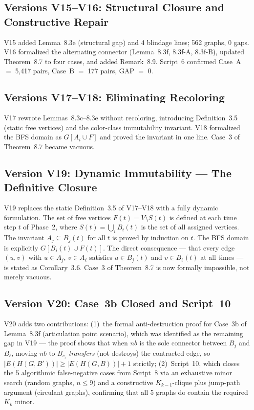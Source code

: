 \documentclass[12pt,a4paper]{article}
\theoremstyle{definition}
\begin{document}
\subsection{Versions V15--V16: Structural Closure and Constructive Repair}

V15 added Lemma~8.3e (structural gap) and 4 blindage lines; 562 graphs,
0 gaps. V16 formalized the alternating connector (Lemma~8.3f, 8.3f-A,
8.3f-B), updated Theorem~8.7 to four cases, and added Remark~8.9.
Script~6 confirmed Case~A $=$ 5,417 pairs, Case~B $=$ 177 pairs,
GAP $=$ 0.

\subsection{Versions V17--V18: Eliminating Recoloring}

V17 rewrote Lemmas~8.3c--8.3e without recoloring, introducing
Definition~3.5 (static free vertices) and the color-class immutability
invariant. V18 formalized the BFS domain as $G[A_i \cup F]$ and proved
the invariant in one line. Case~3 of Theorem~8.7 became vacuous.

\subsection{Version V19: Dynamic Immutability --- The Definitive Closure}

V19 replaces the static Definition~3.5 of V17--V18 with a fully dynamic
formulation. The set of free vertices $F(t) = V \setminus S(t)$ is
defined at each time step $t$ of Phase~2, where $S(t) = \bigcup_i B_i(t)$
is the set of all assigned vertices. The invariant $A_j \subseteq B_j(t)$
for all $t$ is proved by induction on $t$. The BFS domain is explicitly
$G[B_i(t) \cup F(t)]$. The direct consequence --- that every edge
$(u,v)$ with $u \in A_j$, $v \in A_\ell$ satisfies $u \in B_j(t)$ and
$v \in B_\ell(t)$ at all times --- is stated as Corollary~3.6.
Case~3 of Theorem~8.7 is now formally impossible, not merely vacuous.

\subsection{Version V20: Case~3b Closed and Script~10}

V20 adds two contributions: (1)~the formal anti-destruction proof for
Case~3b of Lemma~8.3f (articulation point scenario), which was identified
as the remaining gap in V19 --- the proof shows that when $nb$ is the
sole connector between $B_j$ and $B_\ell$, moving $nb$ to $B_{c_i}$
\emph{transfers} (not destroys) the contracted edge, so
$|E(H(G,B'))| \geq |E(H(G,B))| + 1$ strictly; (2)~Script~10, which
closes the 5 algorithmic false-negative cases from Script~8 via an
exhaustive minor search (random graphs, $n\leq 9$) and a constructive
$K_{k-1}$-clique plus jump-path argument (circulant graphs), confirming
that all 5 graphs do contain the required $K_k$ minor.
\end{document}
